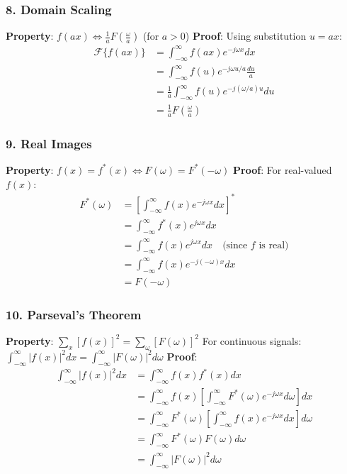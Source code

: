 \documentclass[12pt,a4paper]{article}
\begin{document}
\subsubsection*{8. Domain Scaling}
\textbf{Property}: $f(ax) \Leftrightarrow \frac{1}{a}F\left(\frac{\omega}{a}\right)$ (for $a > 0$)
\newline
\textbf{Proof}: Using substitution $u = ax$:
\begin{align*}
\mathcal{F}\{f(ax)\} &= \int_{-\infty}^{\infty} f(ax)e^{-j\omega x}dx\\
&= \int_{-\infty}^{\infty} f(u)e^{-j\omega u/a}\frac{du}{a}\\
&= \frac{1}{a}\int_{-\infty}^{\infty} f(u)e^{-j(\omega/a) u}du\\
&= \frac{1}{a}F\left(\frac{\omega}{a}\right)
\end{align*}

\subsubsection*{9. Real Images}
\textbf{Property}: $f(x) = f^*(x) \Leftrightarrow F(\omega) = F^*(-\omega)$
\newline
\textbf{Proof}: For real-valued $f(x)$:
\begin{align*}
F^*(\omega) &= \left[\int_{-\infty}^{\infty} f(x)e^{-j\omega x}dx\right]^*\\
&= \int_{-\infty}^{\infty} f^*(x)e^{j\omega x}dx\\
&= \int_{-\infty}^{\infty} f(x)e^{j\omega x}dx \quad \text{(since $f$ is real)}\\
&= \int_{-\infty}^{\infty} f(x)e^{-j(-\omega) x}dx\\
&= F(-\omega)
\end{align*}

\subsubsection*{10. Parseval's Theorem}
\textbf{Property}: $\sum_x [f(x)]^2 = \sum_\omega [F(\omega)]^2$
\newline
For continuous signals: $\int_{-\infty}^{\infty} |f(x)|^2 dx = \int_{-\infty}^{\infty} |F(\omega)|^2 d\omega$
\newline
\textbf{Proof}:
\begin{align*}
\int_{-\infty}^{\infty} |f(x)|^2 dx &= \int_{-\infty}^{\infty} f(x)f^*(x) dx\\
&= \int_{-\infty}^{\infty} f(x)\left[\int_{-\infty}^{\infty} F^*(\omega)e^{-j\omega x}d\omega\right] dx\\
&= \int_{-\infty}^{\infty} F^*(\omega)\left[\int_{-\infty}^{\infty} f(x)e^{-j\omega x}dx\right]d\omega\\
&= \int_{-\infty}^{\infty} F^*(\omega)F(\omega)d\omega\\
&= \int_{-\infty}^{\infty} |F(\omega)|^2 d\omega
\end{align*}
\end{document}
